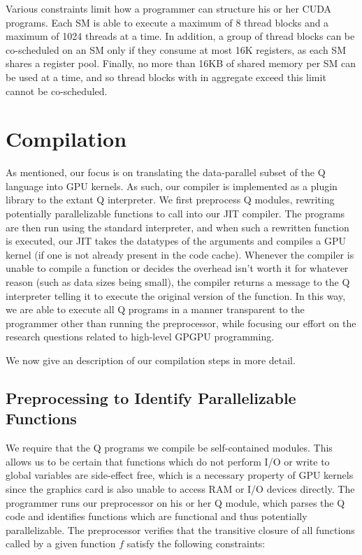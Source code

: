 \documentclass[preprint]{sigplanconf}
\begin{document}
Various constraints limit how a programmer can structure his or her CUDA programs.  Each SM is able to execute a maximum of 8 thread blocks and a maximum of 1024 threads at a time.  In addition, a group of thread blocks can be co-scheduled on an SM only if they consume at most 16K registers, as each SM shares a register pool.  Finally, no more than 16KB of shared memory per SM can be used at a time, and so thread blocks with in aggregate exceed this limit cannot be co-scheduled.

\section{Compilation}
\label{Compilation}

As mentioned, our focus is on translating the data-parallel subset of the Q language into GPU kernels.  As such, our compiler is implemented as a plugin library to the extant Q interpreter.  We first preprocess Q modules, rewriting potentially parallelizable functions to call into our JIT compiler.  The programs are then run using the standard interpreter, and when such a rewritten function is executed, our JIT takes the datatypes of the arguments and compiles a GPU kernel (if one is not already present in the code cache).  Whenever the compiler is unable to compile a function or decides the overhead isn't worth it for whatever reason (such as data sizes being small), the compiler returns a message to the Q interpreter telling it to execute the original version of the function.  In this way, we are able to execute all Q programs in a manner transparent to the programmer other than running the preprocessor, while focusing our effort on the research questions related to high-level GPGPU programming.

We now give an description of our compilation steps in more detail.

\subsection{Preprocessing to Identify Parallelizable Functions}
We require that the Q programs we compile be self-contained modules.  This allows us to be certain that functions which do not perform I/O or write to global variables are side-effect free, which is a necessary property of GPU kernels since the graphics card is also unable to access RAM or I/O devices directly.  The programmer runs our preprocessor on his or her Q module, which parses the Q code and identifies functions which are functional and thus potentially parallelizable.  The preprocessor verifies that the transitive closure of all functions called by a given function $f$ satisfy the following constraints:
\end{document}
